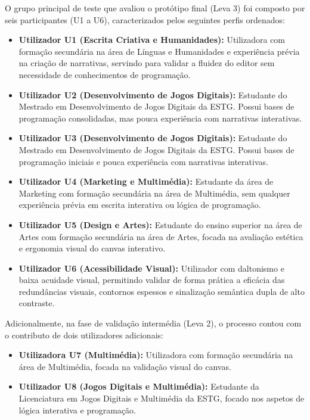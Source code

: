 O grupo principal de teste que avaliou o protótipo final (Leva 3) foi composto por seis participantes (U1 a U6), caracterizados pelos seguintes perfis ordenados:
\begin{itemize}
    \item \textbf{Utilizador U1 (Escrita Criativa e Humanidades):} Utilizadora com formação secundária na área de Línguas e Humanidades e experiência prévia na criação de narrativas, servindo para validar a fluidez do editor sem necessidade de conhecimentos de programação.
    \item \textbf{Utilizador U2 (Desenvolvimento de Jogos Digitais):} Estudante do Mestrado em Desenvolvimento de Jogos Digitais da ESTG. Possui bases de programação consolidadas, mas pouca experiência com narrativas interativas.
    \item \textbf{Utilizador U3 (Desenvolvimento de Jogos Digitais):} Estudante do Mestrado em Desenvolvimento de Jogos Digitais da ESTG. Possui bases de programação iniciais e pouca experiência com narrativas interativas.
    \item \textbf{Utilizador U4 (Marketing e Multimédia):} Estudante da área de Marketing com formação secundária na área de Multimédia, sem qualquer experiência prévia em escrita interativa ou lógica de programação.
    \item \textbf{Utilizador U5 (Design e Artes):} Estudante do ensino superior na área de Artes com formação secundária na área de Artes, focada na avaliação estética e ergonomia visual do canvas interativo.
    \item \textbf{Utilizador U6 (Acessibilidade Visual):} Utilizador com daltonismo e baixa acuidade visual, permitindo validar de forma prática a eficácia das redundâncias visuais, contornos espessos e sinalização semântica dupla de alto contraste.
\end{itemize}

Adicionalmente, na fase de validação intermédia (Leva 2), o processo contou com o contributo de dois utilizadores adicionais:
\begin{itemize}
    \item \textbf{Utilizadora U7 (Multimédia):} Utilizadora com formação secundária na área de Multimédia, focada na validação visual do canvas.
    \item \textbf{Utilizador U8 (Jogos Digitais e Multimédia):} Estudante da Licenciatura em Jogos Digitais e Multimédia da ESTG, focado nos aspetos de lógica interativa e programação.
\end{itemize}

